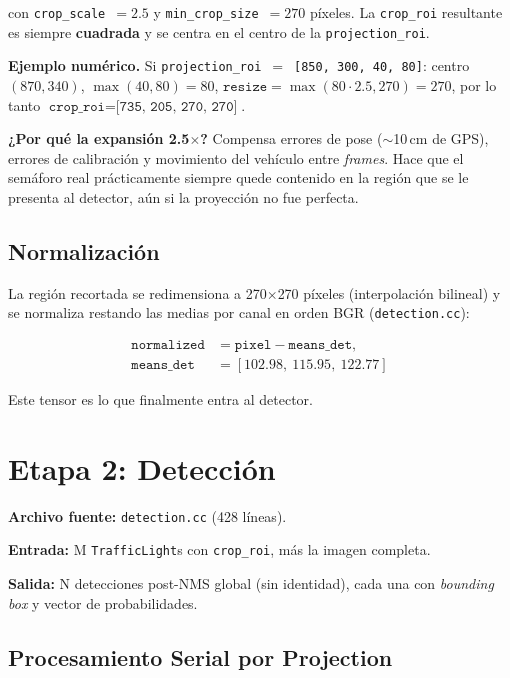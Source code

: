 con \texttt{crop\_scale}~$=2.5$ y \texttt{min\_crop\_size}~$=270$ píxeles. La \texttt{crop\_roi} resultante es siempre \textbf{cuadrada} y se centra en el centro de la \texttt{projection\_roi}.

\textbf{Ejemplo numérico.} Si \texttt{projection\_roi}~$=$~\texttt{[850, 300, 40, 80]}: centro $(870, 340)$, $\max(40, 80) = 80$, $\texttt{resize} = \max(80 \cdot 2.5, 270) = 270$, por lo tanto $\texttt{crop\_roi} = \texttt{[735, 205, 270, 270]}$.

\textbf{¿Por qué la expansión 2.5$\times$?} Compensa errores de pose ($\sim$10\,cm de GPS), errores de calibración y movimiento del vehículo entre \textit{frames}. Hace que el semáforo real prácticamente siempre quede contenido en la región que se le presenta al detector, aún si la proyección no fue perfecta.

\subsection{Normalización}

La región recortada se redimensiona a 270$\times$270 píxeles (interpolación bilineal) y se normaliza restando las medias por canal en orden BGR (\texttt{detection.cc}):

\begin{align*}
\texttt{normalized} &= \texttt{pixel} - \texttt{means\_det}, \\
\texttt{means\_det} &= [102.98,\ 115.95,\ 122.77]
\end{align*}

Este tensor es lo que finalmente entra al detector.

\section{Etapa 2: Detección}
\label{sec:funcionamiento_deteccion}

\textbf{Archivo fuente:} \texttt{detection.cc} (428 líneas).

\textbf{Entrada:} M \texttt{TrafficLight}s con \texttt{crop\_roi}, más la imagen completa.

\textbf{Salida:} N detecciones post-NMS global (sin identidad), cada una con \textit{bounding box} y vector de probabilidades.

\subsection{Procesamiento Serial por Projection}

